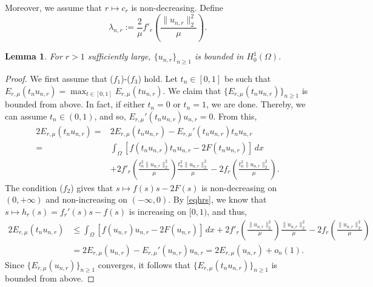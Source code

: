 \documentclass[11pt]{amsart}
\newtheorem{lemma}[theorem]{Lemma}
\newcommand{\norm}[1]{\lVert#1\rVert}
\numberwithin{equation}{section}
\begin{document}
Moreover, we assume that $r \mapsto c_r$ is non-decreasing.
Define
$$
\lambda_{n,r} := \frac{2}{\mu}f'_r\left(\frac{\norm{u_{n,r}}_2^2}{\mu}\right).
$$
\begin{lemma}\label{lembounded}
    For $r>1$ sufficiently large, $\{u_{n,r}\}_{n\geq 1}$ is bounded in $H^1_0(\Omega)$.
\end{lemma}
\begin{proof}
We first assume that ($f_1$)-($f_3$) hold. Let $t_n \in [0, 1]$ be such that $E_{r,\mu}(t_n u_{n,r}) = \max_{t \in [0, 1]} E_{r,\mu}(tu_{n,r})$. We claim that $\{E_{r,\mu}(t_n u_{n,r})\}_{n \geq 1}$ is bounded from above. In fact, if either $t_n = 0$ or $t_n = 1$, we are done. Thereby, we can assume $t_n \in (0, 1)$, and so, $E_{r,\mu}'(t_n u_{n,r}) u_{n,r} = 0$. From this,
$$
\begin{aligned}
    2E_{r,\mu}(t_n u_{n,r}) =& 2E_{r,\mu}(t_n u_{n,r}) - E_{r,\mu}'(t_n u_{n,r}) t_n u_{n,r} \\
    =& \int_{\Omega} \left[f(t_n u_{n,r})t_n u_{n,r}-2F(t_n u_{n,r})\right]\,dx \\
    &+ 2f'_r\left(\frac{t_n^2\norm{u_{n,r}}_2^2}{\mu}\right)\frac{t_n^2\norm{u_{n,r}}^2_{2}}{\mu} -2f_r\left(\frac{t_n^2 \norm{u_{n,r}}_2^2}{\mu}\right).
\end{aligned}
$$
The condition ($f_2$) gives that $s \mapsto f(s)s-2F(s)$ is non-decreasing on $(0,+\infty)$ and non-increasing on $(-\infty,0)$. By \eqref{eqhrs}, we know that  $s \mapsto h_r(s)=f_r'(s)s-f(s)$ is increasing on $[0,1)$, and thus,
$$
\begin{aligned}
2E_{r,\mu}(t_n u_{n,r}) &\leq \int_{\Omega}\left[f(u_{n,r})u_{n,r}-2F(u_{n,r})\right]\,dx + 2f'_r\left(\frac{\norm{u_{n,r}}_2^2}{\mu}\right)\frac{\norm{u_{n,r}}^2_{2}}{\mu} -2f_r\left(\frac{ \norm{u_{n,r}}_2^2}{\mu}\right)\\
&= 2E_{r,\mu}(u_{n,r}) - E_{r,\mu}'(u_{n,r}) u_{n,r} = 2E_{r,\mu}(u_{n,r}) + o_n(1).
\end{aligned}
$$
Since $\{E_{r,\mu}(u_{n,r})\}_{n \geq 1}$ converges, it follows that $\{E_{r,\mu}(t_n u_{n,r})\}_{n \geq 1}$ is bounded from above.


\end{proof}
\end{document}
